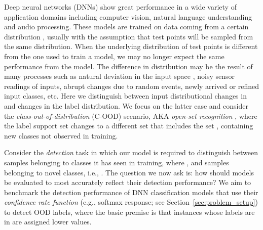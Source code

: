 \documentclass[table]{article} \usepackage{PRIMEarxiv}
\begin{document}
Deep neural networks (DNNs) show great performance in a wide variety of application domains including computer vision, natural language understanding and audio processing.
These models are trained on data coming from a certain distribution , usually with the assumption that test points will be sampled from the same distribution.
When the underlying distribution  of test points is different from the one used to train a model, we may no longer expect the same performance from the model. 
The difference in distribution may be the result of many processes such as natural deviation in the input space , noisy sensor readings of 
inputs, abrupt changes due to random events, newly arrived or refined input classes, etc. Here we distinguish between input 
distributional changes in  and changes in the label distribution.
We focus on the latter case and consider the 
\emph{class-out-of-distribution} (C-OOD) scenario, AKA \emph{open-set recognition} \citep{DBLP:journals/pami/ScheirerRSB13}, where the label support set
 changes to a different set that includes the set , containing new classes not observed in training.

Consider the \emph{detection} task in which our model is required to distinguish between samples belonging to classes it has seen in training, where , and samples belonging to
novel classes, i.e., . 
The question we now ask is: how
should models be evaluated to most accurately reflect their detection performance?
We aim to benchmark the detection performance of DNN classification models that use 
their \emph{confidence rate function}  (e.g., softmax response; see Section~\ref{sec:problem_setup}) to detect OOD labels, where the basic
premise is that instances whose labels are in  are assigned 
lower  values.
\end{document}
